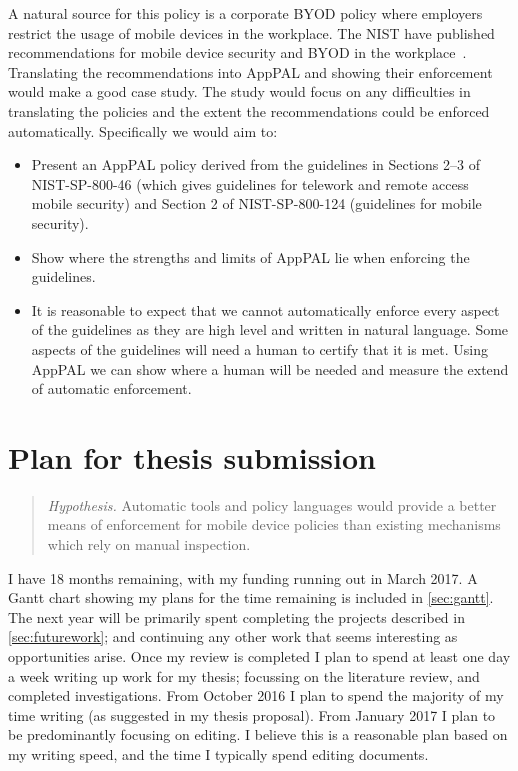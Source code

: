 \documentclass[a4paper]{scrartcl}
\begin{document}
A natural source for this policy is a corporate \ac{BYOD} policy where employers restrict the usage of mobile devices in the workplace.
The \ac{NIST} have published recommendations for mobile device security and \ac{BYOD} in the workplace~\citep{Souppaya:2013jf,Scarfone:2009vy}.
Translating the recommendations into AppPAL and showing their enforcement would make a good case study.
The study would focus on any difficulties in translating the policies and the extent the recommendations could be enforced automatically.
Specifically we would aim to:
\begin{itemize}
  \item
    Present an AppPAL policy derived from the guidelines in Sections 2--3 of NIST-SP-800-46 (which gives guidelines for telework and remote access mobile security) and Section 2 of NIST-SP-800-124 (guidelines for mobile security).
  \item
    Show where the strengths and limits of AppPAL lie when enforcing the guidelines.
  \item
    It is reasonable to expect that we cannot automatically enforce every aspect of the guidelines as they are high level and written in natural language.
    Some aspects of the guidelines will need a human to certify that it is met.
    Using AppPAL we can show where a human will be needed and measure the extend of automatic enforcement.
\end{itemize}

\section{Plan for thesis submission}

\begin{quote}
  \emph{Hypothesis.} Automatic tools and policy languages would provide a
  better means of enforcement for mobile device policies than existing
  mechanisms which rely on manual inspection.
\end{quote}

I have 18 months remaining, with my funding running out in March 2017.
A Gantt chart showing my plans for the time remaining is included in \autoref{sec:gantt}.
The next year will be primarily spent completing the projects described in \autoref{sec:futurework}; and continuing any other work that seems interesting as opportunities arise.
Once my review is completed I plan to spend at least one day a week writing up work for my thesis; focussing on the literature review, and completed investigations.
From October 2016 I plan to spend the majority of my time writing (as suggested in my thesis proposal).
From January 2017 I plan to be predominantly focusing on editing.
I believe this is a reasonable plan based on my writing speed, and the time I typically spend editing documents.
\end{document}
